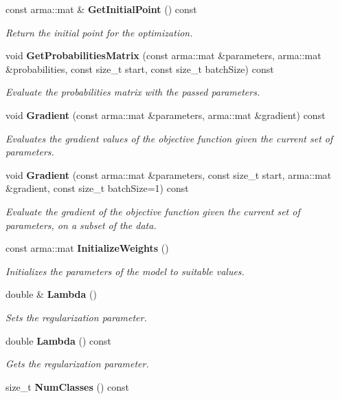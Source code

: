 \begin{DoxyCompactItemize}
const arma\+::mat \& \textbf{ Get\+Initial\+Point} () const
\begin{DoxyCompactList}\small\item\em Return the initial point for the optimization. \end{DoxyCompactList}\item 
void \textbf{ Get\+Probabilities\+Matrix} (const arma\+::mat \&parameters, arma\+::mat \&probabilities, const size\+\_\+t start, const size\+\_\+t batch\+Size) const
\begin{DoxyCompactList}\small\item\em Evaluate the probabilities matrix with the passed parameters. \end{DoxyCompactList}\item 
void \textbf{ Gradient} (const arma\+::mat \&parameters, arma\+::mat \&gradient) const
\begin{DoxyCompactList}\small\item\em Evaluates the gradient values of the objective function given the current set of parameters. \end{DoxyCompactList}\item 
void \textbf{ Gradient} (const arma\+::mat \&parameters, const size\+\_\+t start, arma\+::mat \&gradient, const size\+\_\+t batch\+Size=1) const
\begin{DoxyCompactList}\small\item\em Evaluate the gradient of the objective function given the current set of parameters, on a subset of the data. \end{DoxyCompactList}\item 
const arma\+::mat \textbf{ Initialize\+Weights} ()
\begin{DoxyCompactList}\small\item\em Initializes the parameters of the model to suitable values. \end{DoxyCompactList}\item 
double \& \textbf{ Lambda} ()
\begin{DoxyCompactList}\small\item\em Sets the regularization parameter. \end{DoxyCompactList}\item 
double \textbf{ Lambda} () const
\begin{DoxyCompactList}\small\item\em Gets the regularization parameter. \end{DoxyCompactList}\item 
size\+\_\+t \textbf{ Num\+Classes} () const

\end{DoxyCompactItemize}
